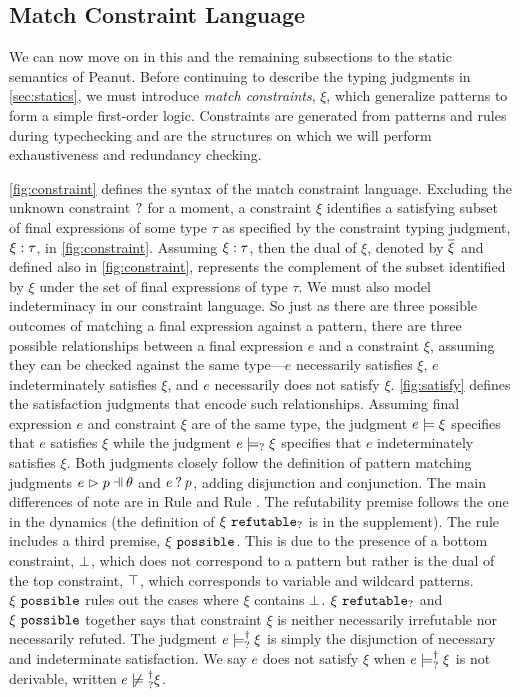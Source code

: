 \subsection{Match Constraint Language}\label{sec:constraint}
We can now move on in this and the remaining subsections to the static semantics of Peanut. Before continuing to describe the typing judgments in \autoref{sec:statics}, we must introduce \emph{match constraints}, $\xi$,
which generalize patterns to form a simple first-order logic. Constraints are generated from patterns and rules during typechecking and are the structures on which we will perform exhaustiveness and redundancy checking. 




\autoref{fig:constraint} defines the syntax of the match constraint language. 
Excluding the unknown constraint $\mathtt{?}$ for a moment, a constraint $\xi$ identifies a satisfying subset of final expressions of some type $\tau$ as specified by the constraint typing judgment,  $\xi : \tau$, in \autoref{fig:constraint}.
Assuming $\xi : \tau$, then the dual of $\xi$, denoted by $\overline{\xi}$ and defined also in \autoref{fig:constraint}, represents the complement of the subset identified by $\xi$ under the set of final expressions of type $\tau$.
We must also model indeterminacy in our constraint language. So just as there are three possible outcomes of matching a final expression against a pattern, there are three possible relationships between a final expression $e$ and a constraint $\xi$, assuming they can be checked against the same type---$e$ necessarily satisfies $\xi$, $e$ indeterminately satisfies $\xi$, and $e$ necessarily does not satisfy $\xi$. 
%
\autoref{fig:satisfy} defines the satisfaction judgments that encode such relationships. Assuming
final expression $e$ and constraint $\xi$ are of the same type, the
judgment $e \models \xi$ specifies that $e$ satisfies $\xi$ while
the judgment $e \models_{?} \xi$ specifies that $e$ indeterminately satisfies $\xi$. Both judgments closely follow the definition of pattern matching judgments $\hpatmatch{e}{p}{\theta}$ and $e \mathbin{?} p$, adding disjunction and conjunction. The main differences of note are in Rule \CSNotIntroPair and Rule \CMSNotIntro. The refutability premise follows the one in the dynamics (the definition of $\xi ~\mathtt{refutable}_?$ is in the supplement). The \CMSNotIntro rule includes a third premise, $\xi ~\mathtt{possible}$. This is due to the presence of a bottom constraint, $\bot$, which does not correspond to a pattern but rather is the dual of the top constraint, $\top$, which corresponds to variable and wildcard patterns. 
$\xi ~\mathtt{possible}$ rules out the cases where $\xi$ contains $\bot$. $\xi ~\mathtt{refutable}_?$ and $\xi ~\mathtt{possible}$ together says that constraint $\xi$ is neither necessarily irrefutable nor necessarily refuted.
The judgment $e \models_{?}^{\dag} \xi$ is simply the disjunction of necessary and indeterminate satisfaction. 
We say $e$ does not satisfy $\xi$ when $e \models_{?}^{\dag} \xi$ is not derivable, written $\cnotsatisfyormay{e}{\xi}$.

